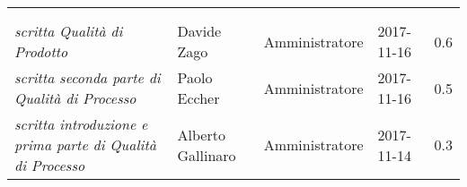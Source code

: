 \newpage 
\section*{}
\begin{table}[H]
	\centering
	\begin{tabular}{p{4cm}|C{3cm}|C{3cm}|R{2.5cm}|R{2cm}}
		
		 & & & & \\
		
		
		\emph{}	 & & & & \\
		\hline
		
		\emph{scritta Qualità di Prodotto}& Davide Zago & Amministratore & 2017-11-16 & 0.6 \\
		\hline
		
		\emph{scritta seconda parte di Qualità di Processo}& Paolo Eccher & Amministratore & 2017-11-16 & 0.5 \\
		\hline
		
		\emph{scritta introduzione e prima parte di Qualità di Processo} & Alberto Gallinaro & Amministratore & 2017-11-14 & 0.3 \\
		
	\end{tabular}
	
\end{table}


\clearpage